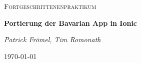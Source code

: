 \documentclass[a4paper]{article}
\begin{document}
	\begin{titlepage}
		\centering
		{\scshape\Large Fortgeschrittenenpraktikum\par}
		\vspace{1.5cm}
		{\huge\bfseries Portierung der Bavarian App in Ionic\par}
		\vspace{2cm}
		{\Large\itshape Patrick Frömel, Tim Romonath\par}
		\vfill
		{\large \today\par}
	\end{titlepage}
   	
   	\tableofcontents
   	
    \newpage
		
	
	\newpage
		
	
\end{document}
